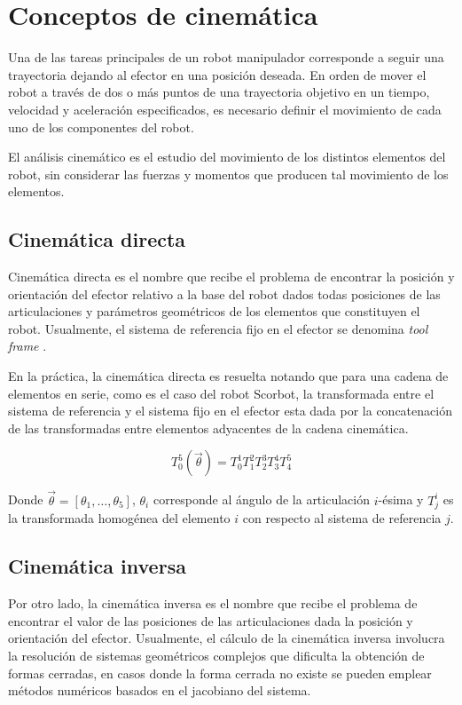 \section{Conceptos de cinemática}

Una de las tareas principales de un robot manipulador corresponde a seguir una trayectoria dejando al efector en una posición deseada. En orden de mover el robot a través de dos o más puntos de una trayectoria objetivo en un tiempo, velocidad y aceleración especificados, es necesario definir el movimiento de cada uno de los componentes del robot.

El análisis cinemático es el estudio del movimiento de los distintos elementos del robot, sin considerar las fuerzas y momentos que producen tal movimiento de los elementos.

\subsection{Cinemática directa}

Cinemática directa es el nombre que recibe el problema de encontrar la posición y orientación del efector relativo a la base del robot dados todas posiciones de las articulaciones y parámetros geométricos de los elementos que constituyen el robot. Usualmente, el sistema de referencia fijo en el efector se denomina \textit{tool frame} \cite{handbook}.

En la práctica, la cinemática directa es resuelta notando que para una cadena de elementos en serie, como es el caso del robot Scorbot, la transformada entre el sistema de referencia y el sistema fijo en el efector esta dada por la concatenación de las transformadas entre elementos adyacentes de la cadena cinemática.

\begin{equation}
T_0^5(\vec{\theta}) = T_0^1 T_1^2 T_2^3 T_3^4 T_4^5 
\end{equation}

Donde $\vec{\theta}=[\theta_1,\dotsc,\theta_5]$, $\theta_i$ corresponde al ángulo de la articulación $i$-ésima y $T_j^i$ es la transformada homogénea del elemento $i$ con respecto al sistema de referencia $j$.

\subsection{Cinemática inversa}

Por otro lado, la cinemática inversa es el nombre que recibe el problema de encontrar el valor de las posiciones de las articulaciones dada la posición y orientación del efector.
Usualmente, el cálculo de la cinemática inversa involucra la resolución de sistemas geométricos complejos que dificulta la obtención de formas cerradas, en casos donde la forma cerrada no existe se pueden emplear métodos numéricos basados en el jacobiano del sistema.


